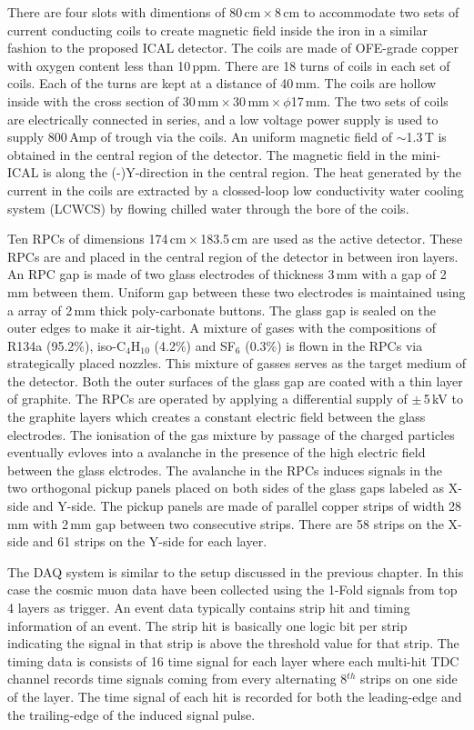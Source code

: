 There are four slots with dimentions of 80\,cm\,$\times$\,8\,cm to
accommodate two sets of current conducting coils to create magnetic
field inside the iron in a similar fashion to the proposed
ICAL detector. The coils are made of OFE-grade copper with
oxygen content less than 10\,ppm. There are 18 turns of coils in each
set of coils. Each of the turns are kept at a distance of 40\,mm.
The coils are hollow inside with the cross section of
30\,mm\,$\times$\,30\,mm\,$\times$\,$\phi$17\,mm.
The two sets of coils are electrically connected in series,
and a low voltage power supply is used to supply 800\,Amp
of trough via the coils. An uniform magnetic field of $\sim$1.3\,T
is obtained in the central region of the detector. The magnetic field
in the mini-ICAL is along the (-)Y-direction in the central region.
The heat generated by the current in the
coils are extracted by a clossed-loop low conductivity water cooling
system (LCWCS) by flowing chilled water through the bore of the coils.

Ten RPCs of dimensions 174\,cm\,$\times$\,183.5\,cm are used as the
active detector. These RPCs are and placed in the central region of
the detector in between iron layers.
An RPC gap is made of two glass electrodes of thickness 3\,mm with
a gap of 2\,mm between them. Uniform gap between these two electrodes
is maintained using a array of 2\,mm thick poly-carbonate buttons.
The glass gap is sealed on the outer edges to make it air-tight.
A mixture of gases with the compositions of R134a (95.2\%),
iso-C$_4$H$_{10}$ (4.2\%) and SF$_6$ (0.3\%) is flown in the RPCs
via strategically placed nozzles. This mixture of gasses serves as the
target medium of the detector.
Both the outer surfaces of the glass gap are coated with a thin layer
of graphite. The RPCs are operated by applying a differential supply of
$\pm$\,5\,kV to the graphite layers which creates a constant electric
field between the glass electrodes. The ionisation of the gas mixture
by passage of the charged particles eventually evloves into a
avalanche in the presence of the high electric field between the glass
elctrodes. The avalanche in the RPCs induces signals in the two
orthogonal pickup panels placed on both sides of the glass gaps
labeled as X-side and Y-side. The pickup panels are made of parallel
copper strips of width 28\,mm with 2\,mm gap between two consecutive
strips. There are 58 strips on the X-side and 61 strips on the
Y-side for each layer.

The DAQ system is similar to the setup discussed in the previous
chapter. In this case the cosmic muon data have been collected using
the 1-Fold signals from top 4 layers as trigger.
An event data typically contains strip hit and timing information
of an event. The strip hit is basically one logic bit per strip
indicating the signal in that strip is above the threshold value
for that strip. The timing data is consists of 16 time signal for
each layer where each multi-hit TDC channel records time signals
coming from every alternating 8$^{th}$ strips on one side of the layer.
The time signal of each hit is recorded for both the leading-edge and
the trailing-edge of the induced signal pulse.


